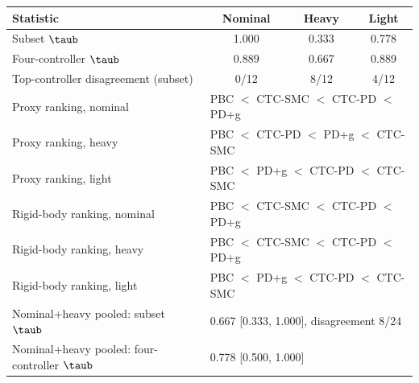 \begin{tabular}{lccc}
\toprule
Statistic & Nominal & Heavy & Light \\
\midrule
Subset $\taub$ & 1.000 & 0.333 & 0.778 \\
Four-controller $\taub$ & 0.889 & 0.667 & 0.889 \\
Top-controller disagreement (subset) & 0/12 & 8/12 & 4/12 \\
\midrule
Proxy ranking, nominal & \multicolumn{3}{l}{PBC $<$ CTC-SMC $<$ CTC-PD $<$ PD+g} \\
Proxy ranking, heavy & \multicolumn{3}{l}{PBC $<$ CTC-PD $<$ PD+g $<$ CTC-SMC} \\
Proxy ranking, light & \multicolumn{3}{l}{PBC $<$ PD+g $<$ CTC-PD $<$ CTC-SMC} \\
Rigid-body ranking, nominal & \multicolumn{3}{l}{PBC $<$ CTC-SMC $<$ CTC-PD $<$ PD+g} \\
Rigid-body ranking, heavy & \multicolumn{3}{l}{PBC $<$ CTC-SMC $<$ CTC-PD $<$ PD+g} \\
Rigid-body ranking, light & \multicolumn{3}{l}{PBC $<$ PD+g $<$ CTC-PD $<$ CTC-SMC} \\
\midrule
Nominal+heavy pooled: subset $\taub$ & \multicolumn{3}{l}{0.667 [0.333, 1.000], disagreement 8/24} \\
Nominal+heavy pooled: four-controller $\taub$ & \multicolumn{3}{l}{0.778 [0.500, 1.000]} \\
\bottomrule
\end{tabular}
